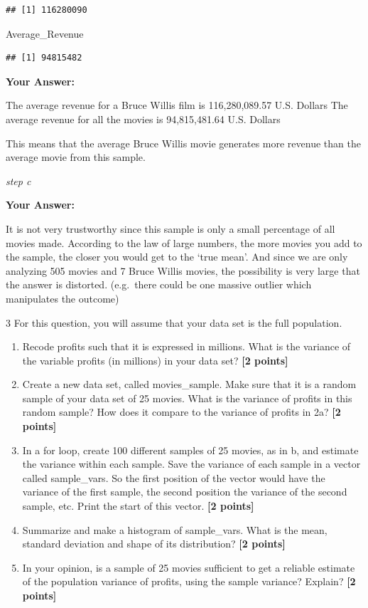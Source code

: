 \documentclass[
]{article}
\newenvironment{Shaded}{\begin{snugshade}}{\end{snugshade}}
\newcommand{\NormalTok}[1]{#1}
\providecommand{\tightlist}{%
  \setlength{\itemsep}{0pt}\setlength{\parskip}{0pt}}
\begin{document}
\begin{verbatim}
## [1] 116280090
\end{verbatim}

\begin{Shaded}
\begin{Highlighting}[]
\NormalTok{Average\_Revenue}
\end{Highlighting}
\end{Shaded}

\begin{verbatim}
## [1] 94815482
\end{verbatim}

\textbf{Your Answer:}

The average revenue for a Bruce Willis film is 116,280,089.57 U.S.
Dollars The average revenue for all the movies is 94,815,481.64 U.S.
Dollars

This means that the average Bruce Willis movie generates more revenue
than the average movie from this sample.

\emph{step c}

\textbf{Your Answer:}

It is not very trustworthy since this sample is only a small percentage
of all movies made. According to the law of large numbers, the more
movies you add to the sample, the closer you would get to the `true
mean'. And since we are only analyzing 505 movies and 7 Bruce Willis
movies, the possibility is very large that the answer is distorted.
(e.g.~there could be one massive outlier which manipulates the outcome)

3 For this question, you will assume that your data set is the full
population.

\begin{enumerate}
\def\labelenumi{\alph{enumi}.}
\tightlist
\item
  Recode profits such that it is expressed in millions. What is the
  variance of the variable profits (in millions) in your data set?
  \textbf{[2 points]}
\item
  Create a new data set, called movies\_sample. Make sure that it is a
  random sample of your data set of 25 movies. What is the variance of
  profits in this random sample? How does it compare to the variance of
  profits in 2a? \textbf{[2 points]}
\item
  In a for loop, create 100 different samples of 25 movies, as in b, and
  estimate the variance within each sample. Save the variance of each
  sample in a vector called sample\_vars. So the first position of the
  vector would have the variance of the first sample, the second
  position the variance of the second sample, etc. Print the start of
  this vector. \textbf{[2 points]}
\item
  Summarize and make a histogram of sample\_vars. What is the mean,
  standard deviation and shape of its distribution? \textbf{[2 points]}
\item
  In your opinion, is a sample of 25 movies sufficient to get a reliable
  estimate of the population variance of profits, using the sample
  variance? Explain? \textbf{[2 points]}
\end{enumerate}
\end{document}
